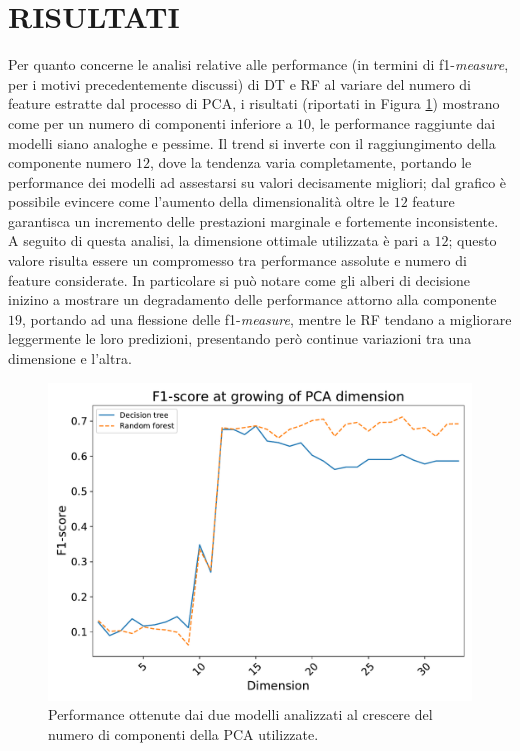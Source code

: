 \section{RISULTATI}
Per quanto concerne le analisi relative alle performance (in termini di f1-\textit{measure}, per i motivi precedentemente discussi) di DT e RF al variare del numero di feature estratte dal processo di PCA, i risultati (riportati in Figura \ref{fig:pca-perf}) mostrano come per un numero di componenti inferiore a $10$, le performance raggiunte dai modelli siano analoghe e pessime. Il trend si inverte con il raggiungimento della componente numero $12$, dove la tendenza varia completamente, portando le performance dei modelli ad assestarsi su valori decisamente migliori; dal grafico è possibile evincere come l'aumento della dimensionalità oltre le $12$ feature garantisca un incremento delle prestazioni marginale e fortemente inconsistente.
A seguito di questa analisi, la dimensione ottimale utilizzata è pari a $12$; questo valore risulta essere un compromesso tra performance assolute e numero di feature considerate.
In particolare si può notare come gli alberi di decisione inizino a mostrare un degradamento delle performance attorno alla componente $19$, portando ad una flessione delle f1-\textit{measure}, mentre le RF tendano a migliorare leggermente le loro predizioni, presentando però continue variazioni tra una dimensione e l'altra.\\
\begin{figure}
	\centering
	\includegraphics[width=1\linewidth]{images/pca-perf}
	\caption{Performance ottenute dai due modelli analizzati al crescere del numero di componenti della PCA utilizzate.}
	\label{fig:pca-perf}
\end{figure}
